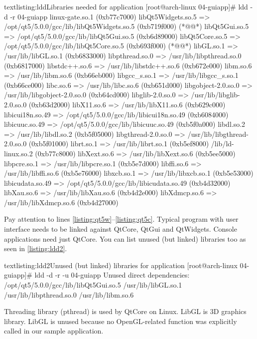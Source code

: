 \begin{fdoccode}{text}{listing:ldd}{Libraries needed for  application}
[root@arch-linux 04-guiapp]# ldd -d -r 04-guiapp
linux-gate.so.1 (0xb77c7000)
libQt5Widgets.so.5 => /opt/qt5/5.0.0/gcc/lib/libQt5Widgets.so.5 (0xb719f000) (*@\label{listing:qt5w}@*)
libQt5Gui.so.5 => /opt/qt5/5.0.0/gcc/lib/libQt5Gui.so.5 (0xb6d89000)
libQt5Core.so.5 => /opt/qt5/5.0.0/gcc/lib/libQt5Core.so.5 (0xb693f000) (*@\label{listing:qt5c}@*)
libGL.so.1 => /usr/lib/libGL.so.1 (0xb6833000)
libpthread.so.0 => /usr/lib/libpthread.so.0 (0xb6817000)
libstdc++.so.6 => /usr/lib/libstdc++.so.6 (0xb672e000)
libm.so.6 => /usr/lib/libm.so.6 (0xb66eb000)
libgcc_s.so.1 => /usr/lib/libgcc_s.so.1 (0xb66ce000)
libc.so.6 => /usr/lib/libc.so.6 (0xb651d000)
libgobject-2.0.so.0 => /usr/lib/libgobject-2.0.so.0 (0xb64cd000)
libglib-2.0.so.0 => /usr/lib/libglib-2.0.so.0 (0xb63d2000)
libX11.so.6 => /usr/lib/libX11.so.6 (0xb629c000)
libicui18n.so.49 => /opt/qt5/5.0.0/gcc/lib/libicui18n.so.49 (0xb6084000)
libicuuc.so.49 => /opt/qt5/5.0.0/gcc/lib/libicuuc.so.49 (0xb5f0a000)
libdl.so.2 => /usr/lib/libdl.so.2 (0xb5f05000)
libgthread-2.0.so.0 => /usr/lib/libgthread-2.0.so.0 (0xb5f01000)
librt.so.1 => /usr/lib/librt.so.1 (0xb5ef8000)
/lib/ld-linux.so.2 (0xb77c8000)
libXext.so.6 => /usr/lib/libXext.so.6 (0xb5ee5000)
libpcre.so.1 => /usr/lib/libpcre.so.1 (0xb5e7d000)
libffi.so.6 => /usr/lib/libffi.so.6 (0xb5e76000)
libxcb.so.1 => /usr/lib/libxcb.so.1 (0xb5e53000)
libicudata.so.49 => /opt/qt5/5.0.0/gcc/lib/libicudata.so.49 (0xb4d32000)
libXau.so.6 => /usr/lib/libXau.so.6 (0xb4d2e000)
libXdmcp.so.6 => /usr/lib/libXdmcp.so.6 (0xb4d27000)
\end{fdoccode}

Pay attention to lines \ref{listing:qt5w}--\ref{listing:qt5c}. Typical program with user interface needs to be linked against QtCore, QtGui and QtWidgets. Console applications need just QtCore. You can list unused (but linked) libraries too as seen in \autoref{listing:ldd2}.

\begin{fdoccode}{text}{listing:ldd2}{Unused (but linked) libraries for  application}
[root@arch-linux 04-guiapp]# ldd -d -r -u 04-guiapp
Unused direct dependencies:
/opt/qt5/5.0.0/gcc/lib/libQt5Gui.so.5
/usr/lib/libGL.so.1
/usr/lib/libpthread.so.0
/usr/lib/libm.so.6
\end{fdoccode}

Threading library (pthread) is used by QtCore on Linux. LibGL is 3D graphics library. LibGL is unused because no OpenGL-related function was explicitly called in our sample application.

